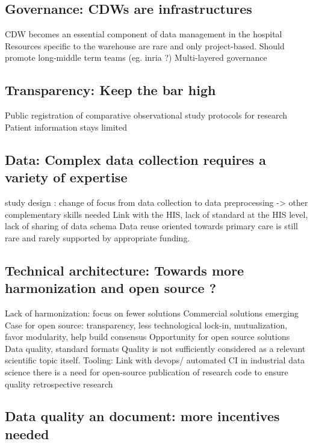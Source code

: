 \documentclass[french,12pt,twoside,a4paper]{book}
\begin{document}
\subsection{Governance: CDWs are
  infrastructures}\label{subsec:cdw:recommendations:governance}

CDW becomes an essential component of data management in the hospital Resources
specific to the warehouse are rare and only project-based. Should promote
long-middle term teams (eg. inria ?) Multi-layered governance

\subsection{Transparency: Keep the bar
  high}\label{subsec:cdw:recommendations:transparency} Public registration of
comparative observational study protocols for research Patient information stays
limited

\subsection{Data: Complex data collection requires a variety of
  expertise}\label{subsec:cdw:recommendations:data} study design : change of
focus from data collection to data preprocessing -> other complementary skills
needed Link with the HIS, lack of standard at the HIS level, lack of sharing of
data schema Data reuse oriented towards primary care is still rare and rarely
supported by appropriate funding.


\subsection{Technical architecture: Towards more harmonization and open source ?
}\label{subsec:cdw:recommendations:architecture} Lack of harmonization: focus on
fewer solutions Commercial solutions emerging Case for open source:
transparency, less technological lock-in, mutualization, favor modularity, help
build consensus Opportunity for open source solutions Data quality, standard
formats Quality is not sufficiently considered as a relevant scientific topic
itself. Tooling: Link with devops/ automated CI in industrial data science there
is a need for open-source publication of research code to ensure quality
retrospective research

\subsection{Data quality an document: more incentives needed}\label{subsec:cdw:recommendations:quality}
\end{document}
